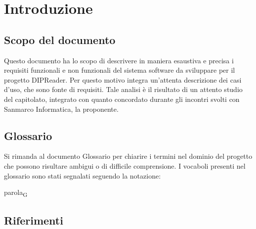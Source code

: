 \documentclass[a4paper,12pt]{article}
\begin{document}
    \tableofcontents
    \newpage

    \listoffigures
    \newpage
    
    \listoftables
    \newpage

    \section{Introduzione} {
        \subsection{Scopo del documento} {        
            Questo documento ha lo scopo di descrivere in maniera esaustiva e precisa i requisiti funzionali e non funzionali del sistema software da sviluppare per il progetto DIPReader. Per questo motivo integra un'attenta descrizione dei casi d'uso, che sono fonte di requisiti.
            Tale analisi è il risultato di un attento studio del capitolato, integrato con quanto concordato durante gli incontri svolti con Sanmarco Informatica, la proponente.
        }
        \subsection{Glossario} {
            Si rimanda al documento Glossario per chiarire i termini nel dominio del progetto che possono risultare ambigui o di difficile comprensione. I vocaboli presenti nel glossario sono stati segnalati seguendo la notazione:
            \begin{center}
                parola\textsubscript{G}
            \end{center}
        }
        \subsection{Riferimenti} {
}}
\end{document}
